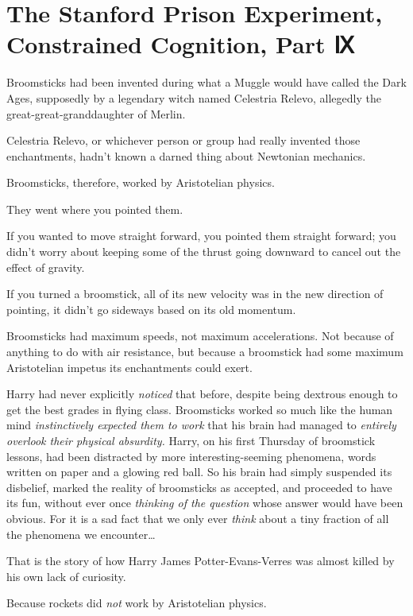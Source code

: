\chapter{The Stanford Prison Experiment, Constrained Cognition, Part
Ⅸ}\label{the-stanford-prison-experiment-constrained-cognition-part}

Broomsticks had been invented during what a Muggle would have called the
Dark Ages, supposedly by a legendary witch named Celestria Relevo,
allegedly the great-great-granddaughter of Merlin.

Celestria Relevo, or whichever person or group had really invented those
enchantments, hadn't known a darned thing about Newtonian mechanics.

Broomsticks, therefore, worked by Aristotelian physics.

They went where you pointed them.

If you wanted to move straight forward, you pointed them straight
forward; you didn't worry about keeping some of the thrust going
downward to cancel out the effect of gravity.

If you turned a broomstick, all of its new velocity was in the new
direction of pointing, it didn't go sideways based on its old momentum.

Broomsticks had maximum speeds, not maximum accelerations. Not because
of anything to do with air resistance, but because a broomstick had some
maximum Aristotelian impetus its enchantments could exert.

Harry had never explicitly \emph{noticed} that before, despite being
dextrous enough to get the best grades in flying class. Broomsticks
worked so much like the human mind \emph{instinctively expected them to
work} that his brain had managed to \emph{entirely overlook their
physical absurdity.} Harry, on his first Thursday of broomstick lessons,
had been distracted by more interesting-seeming phenomena, words written
on paper and a glowing red ball. So his brain had simply suspended its
disbelief, marked the reality of broomsticks as accepted, and proceeded
to have its fun, without ever once \emph{thinking of the question} whose
answer would have been obvious. For it is a sad fact that we only ever
\emph{think} about a tiny fraction of all the phenomena we
encounter\ldots{}

That is the story of how Harry James Potter-Evans-Verres was almost
killed by his own lack of curiosity.

Because rockets did \emph{not} work by Aristotelian physics.

